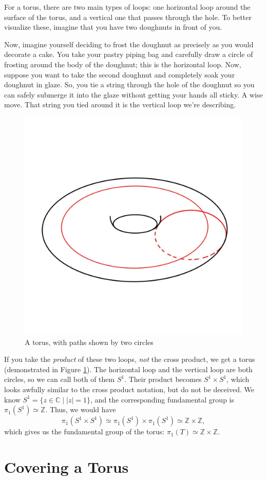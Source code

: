 \documentclass[12pt,a4paper,reqno,parskip=full]{amsart}
\numberwithin{equation}{section}
\theoremstyle{plain}
\theoremstyle{definition}
\def\Z{{\mathbb Z}}
\def\C{{\mathbb C}}
\begin{document}
For a torus, there are two main types of loops: one horizontal loop around the surface of the torus, and a vertical one that passes through the hole. To better visualize these, imagine that you have two doughnuts in front of you.

Now, imagine yourself deciding to frost the doughnut as precisely as you would decorate a cake. You take your pastry piping bag and carefully draw a circle of frosting around the body of the doughnut; this is the horizontal loop. Now, suppose you want to take the second doughnut and completely soak your doughnut in glaze. So, you tie a string through the hole of the doughnut so you can safely submerge it into the glaze without getting your hands all sticky. A wise move. That string you tied around it is the vertical loop we're describing.

\begin{figure}
    \centering
    \captionsetup{justification=centering}
    \includegraphics[width=0.5\linewidth]{images/torus with curves.jpg}
    \caption{A torus, with paths shown by two circles}
    \label{fig:two circles}
\end{figure}

If you take the \textit{product} of these two loops, \textit{not} the cross product, we get a torus (demonstrated in Figure \ref{fig:two circles}). The horizontal loop and the vertical loop are both circles, so we can call both of them $S^1$. Their product becomes $S^1\times S^1$, which looks awfully similar to the cross product notation, but do not be deceived. We know $S^1=\{z\in\C\mid|z|=1\}$, and the corresponding fundamental group is $\pi_1(S^1)\simeq\Z$. Thus, we would have
\[\pi_1(S^1\times S^1)\simeq\pi_1(S^1)\times\pi_1(S^1)\simeq\Z\times\Z,\]
which gives us the fundamental group of the torus: $\pi_1(T)\simeq\Z\times\Z.$

\section{Covering a Torus}
\end{document}
